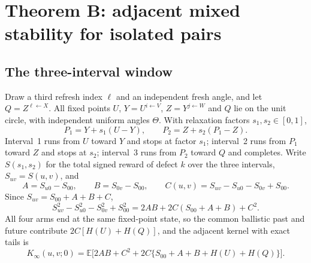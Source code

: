 \documentclass[11pt]{article}
\theoremstyle{remark}\newtheorem{remark}[theorem]{Remark}
\newcommand{\E}{\mathbb E}
\begin{document}
\section{Theorem B: adjacent mixed stability for isolated pairs}\label{sec:B}

\subsection{The three-interval window}
Draw a third refresh index $\ell$ and an independent fresh angle, and let $Q=Z^{\ell\leftarrow X}$. All fixed points $U$, $Y=U^{i\leftarrow V}$, $Z=Y^{j\leftarrow W}$ and $Q$ lie on the unit circle, with independent uniform angles $\Theta$. With relaxation factors $s_1,s_2\in[0,1]$,
\begin{equation}\label{eq:Bwin}
P_1=Y+s_1(U-Y),\qquad P_2=Z+s_2(P_1-Z).
\end{equation}
Interval~1 runs from $U$ toward $Y$ and stops at factor $s_1$; interval~2 runs from $P_1$ toward $Z$ and stops at $s_2$; interval~3 runs from $P_2$ toward $Q$ and completes. Write $S(s_1,s_2)$ for the total signed reward of defect $k$ over the three intervals, $S_{uv}=S(u,v)$, and
\begin{equation}\label{eq:Bmixed}
A=S_{u0}-S_{00},\qquad B=S_{0v}-S_{00},\qquad C(u,v)=S_{uv}-S_{u0}-S_{0v}+S_{00}.
\end{equation}
Since $S_{uv}=S_{00}+A+B+C$,
\begin{equation}\label{eq:adjidentity}
S_{uv}^2-S_{u0}^2-S_{0v}^2+S_{00}^2=2AB+2C(S_{00}+A+B)+C^2 .
\end{equation}
All four arms end at the same fixed-point state, so the common ballistic past and future contribute $2C[H(U)+H(Q)]$, and the adjacent kernel with exact tails is
\begin{equation}\label{eq:adjkernel}
K_\infty(u,v;0)=\E\bigl[2AB+C^2+2C\{S_{00}+A+B+H(U)+H(Q)\}\bigr].
\end{equation}
\end{document}
